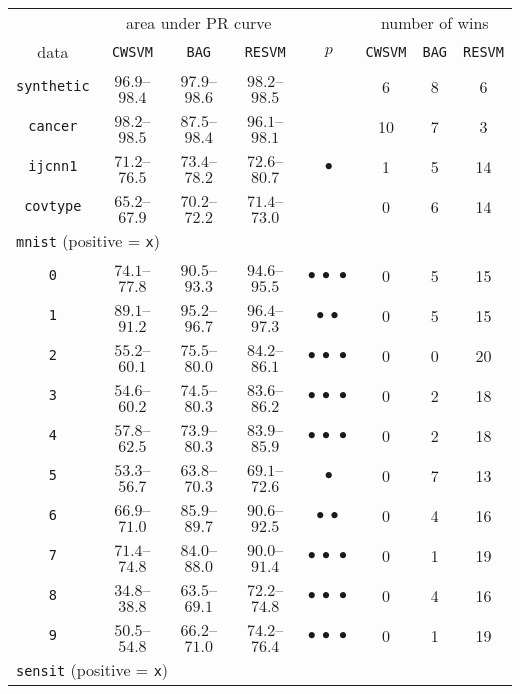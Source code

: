 \begin{table}[!h]
\centering
\begin{tabular}{cccccccc}
\toprule
 & \multicolumn{3}{c}{area under PR curve} & & \multicolumn{3}{c}{number of wins} \\ \cline{2-4} \cline{6-8}
data & \texttt{CWSVM} & \texttt{BAG} & \texttt{RESVM} & $p$ & \texttt{CWSVM} & \texttt{BAG} & \texttt{RESVM} \\
\midrule
\texttt{synthetic} & $96.9$--$98.4$ & $97.9$--$98.6$ & $98.2$--$98.5$ &  & 6 & 8 & 6\\ 
\texttt{cancer} & $98.2$--$98.5$ & $87.5$--$98.4$ & $96.1$--$98.1$ &  & 10 & 7 & 3\\
\texttt{ijcnn1} & $71.2$--$76.5$ & $73.4$--$78.2$ & $72.6$--$80.7$ & $\bullet$ & 1 & 5 & 14\\
\texttt{covtype} & $65.2$--$67.9$ & $70.2$--$72.2$ & $71.4$--$73.0$ &  & 0 & 6 & 14\\ 
\multicolumn{3}{l}{\texttt{mnist} (positive = \texttt{x})} \\
\texttt{0} & $74.1$--$77.8$ & $90.5$--$93.3$ & $94.6$--$95.5$ & $\bullet\ \bullet\ \bullet$ & 0 & 5 & 15\\ 
\texttt{1} & $89.1$--$91.2$ & $95.2$--$96.7$ & $96.4$--$97.3$ & $\bullet\ \bullet$ & 0 & 5 & 15\\ 
\texttt{2} & $55.2$--$60.1$ & $75.5$--$80.0$ & $84.2$--$86.1$ & $\bullet\ \bullet\ \bullet$ & 0 & 0 & 20\\ 
\texttt{3} & $54.6$--$60.2$ & $74.5$--$80.3$ & $83.6$--$86.2$ & $\bullet\ \bullet\ \bullet$ & 0 & 2 & 18\\ 
\texttt{4} & $57.8$--$62.5$ & $73.9$--$80.3$ & $83.9$--$85.9$ & $\bullet\ \bullet\ \bullet$ & 0 & 2 & 18\\ 
\texttt{5} & $53.3$--$56.7$ & $63.8$--$70.3$ & $69.1$--$72.6$ & $\bullet$ & 0 & 7 & 13\\ 
\texttt{6} & $66.9$--$71.0$ & $85.9$--$89.7$ & $90.6$--$92.5$ & $\bullet\ \bullet$ & 0 & 4 & 16\\ 
\texttt{7} & $71.4$--$74.8$ & $84.0$--$88.0$ & $90.0$--$91.4$ & $\bullet\ \bullet\ \bullet$ & 0 & 1 & 19\\ 
\texttt{8} & $34.8$--$38.8$ & $63.5$--$69.1$ & $72.2$--$74.8$ & $\bullet\ \bullet\ \bullet$ & 0 & 4 & 16\\ 
\texttt{9} & $50.5$--$54.8$ & $66.2$--$71.0$ & $74.2$--$76.4$ & $\bullet\ \bullet\ \bullet$ & 0 & 1 & 19\\ 
\multicolumn{3}{l}{\texttt{sensit} (positive = \texttt{x})} \\

\end{tabular}
\end{table}
